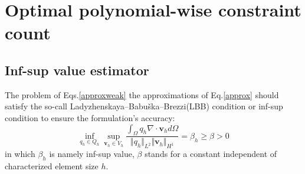 \section{Optimal polynomial-wise constraint count}
\subsection{Inf-sup value estimator}
The problem of Eqs.\eqref{approxweak} the approximations of Eq.\eqref{approx} should satisfy the so-call Ladyzhenskaya–Babuška–Brezzi(LBB) condition or inf-sup condition \cite{bathe1996} to ensure the formulation's accuracy:
\begin{equation}
    \inf_{q_h \in Q_h} \sup_{\boldsymbol v_h \in V_h} \frac{\int_{\Omega} q_h \nabla \cdot \boldsymbol v_h d\Omega}{\Vert q_h \Vert_{L^2} \Vert \boldsymbol v_h \Vert_{H^1}} = \beta_h \ge \beta > 0
\end{equation}
in which $\beta_h$ is namely inf-sup value, $\beta$ stands for a constant independent of characterized element size $h$.

